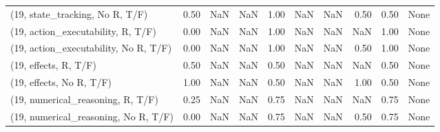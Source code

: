 \begin{table*}[h!]
\begin{adjustbox}{width=2\columnwidth,center}
\begin{tabular}{lrrr|rrr|rrr}
(19, state\_tracking, No R, T/F)       &                      0.50 &                   NaN &                       NaN &                          1.00 &                       NaN &                           NaN &                                   0.50 &                               0.50 &                                  None \\
(19, action\_executability, R, T/F)    &                      0.00 &                   NaN &                       NaN &                          1.00 &                       NaN &                           NaN &                                    NaN &                               1.00 &                                  None \\
(19, action\_executability, No R, T/F) &                      0.00 &                   NaN &                       NaN &                          1.00 &                       NaN &                           NaN &                                   0.50 &                               1.00 &                                  None \\
(19, effects, R, T/F)                 &                      0.50 &                   NaN &                       NaN &                          0.50 &                       NaN &                           NaN &                                    NaN &                               0.50 &                                  None \\
(19, effects, No R, T/F)              &                      1.00 &                   NaN &                       NaN &                          0.50 &                       NaN &                           NaN &                                   1.00 &                               0.50 &                                  None \\
(19, numerical\_reasoning, R, T/F)     &                      0.25 &                   NaN &                       NaN &                          0.75 &                       NaN &                           NaN &                                    NaN &                               0.75 &                                  None \\
(19, numerical\_reasoning, No R, T/F)  &                      0.00 &                   NaN &                       NaN &                          0.75 &                       NaN &                           NaN &                                   0.50 &                               0.75 &                                  None \\

\end{tabular}
\end{adjustbox}
\end{table*}
